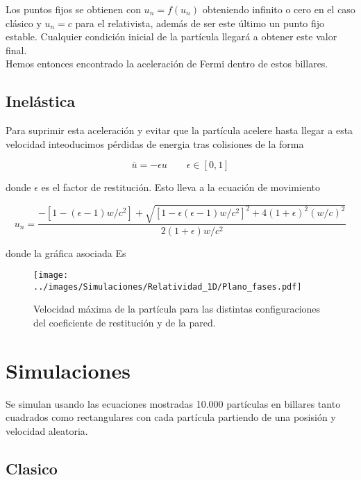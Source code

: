\documentclass[11pt, spanish]{article}
\begin{document}
Los puntos fijos se obtienen con \( u_n = f(u_n) \) obteniendo infinito o cero en el caso clásico y \( u_n = c \) para el relativista, además de ser este último un punto fijo estable. Cualquier condición inicial de la partícula llegará a obtener este valor final. \\

Hemos entonces encontrado la aceleración de Fermi dentro de estos billares. 

\subsection{Inelástica}

Para suprimir esta aceleración y evitar que la partícula acelere hasta llegar a esta velocidad inteoducimos pérdidas de energia tras colisiones de la forma 

\begin{equation}
    \bar{u} = -\epsilon u \qquad \epsilon \in \left[ 0, 1 \right]
\end{equation}

donde \( \epsilon \) es el factor de restitución. Esto lleva a la ecuación de movimiento 

\begin{equation}
    u_n = \dfrac{-\left[ 1 -  (\epsilon - 1)w/c^2 \right] + \sqrt{\left[ 1 - \epsilon (\epsilon - 1)w/c^2 \right]^2 + 4(1+\epsilon)^2(w/c)^2}}{2(1+\epsilon)w/c^2}
\end{equation}

donde la gráfica asociada Es

\begin{figure}[H]
    \centering
    \texttt{[image: ../images/Simulaciones/Relatividad\_1D/Plano\_fases.pdf]}
    \caption{Velocidad máxima de la partícula para las distintas configuraciones del coeficiente de restitución y de la pared.}
    \label{fig:plano_fases_coef_wall}
\end{figure}

\section{Simulaciones}

Se simulan usando las ecuaciones mostradas 10.000 partículas en billares tanto cuadrados como rectangulares con cada partícula partiendo de una posisión y velocidad aleatoria. \\

\subsection{Clasico}
\end{document}

